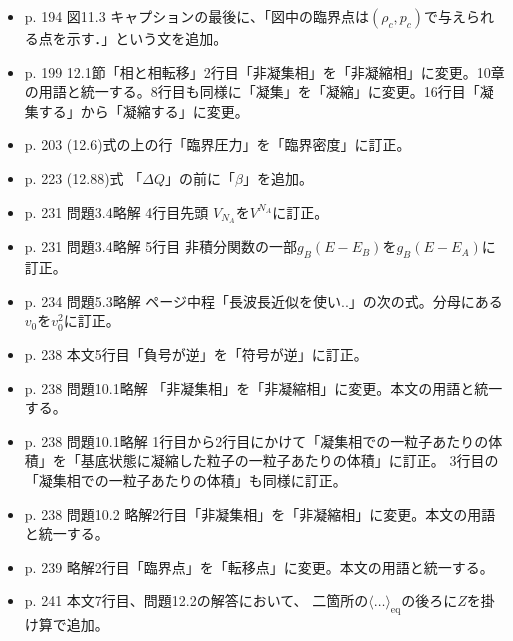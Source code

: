 \documentclass{ltjsarticle}
\begin{document}
\begin{itemize}
キャプションの最後に「図中の臨界点は$(\rho_{c}, T_{c})$で与えられる点を示す．」という文を追加。
\item
p. 194 図11.3 キャプションの最後に、「図中の臨界点は$(\rho_{c}, p_{c})$で与えられる点を示す．」という文を追加。
\item
p. 199 12.1節「相と相転移」2行目「非凝集相」を「非凝縮相」に変更。10章の用語と統一する。8行目も同様に「凝集」を「凝縮」に変更。16行目「凝集する」から「凝縮する」に変更。
\item
p. 203 (12.6)式の上の行「臨界圧力」を「臨界密度」に訂正。
\item
p. 223 (12.88)式 「$\Delta Q$」の前に「$\beta$」を追加。
\item
p. 231 問題3.4略解 4行目先頭 $V_{N_A}$を$V^{N_A}$に訂正。
\item
p. 231 問題3.4略解 5行目 非積分関数の一部$g_B(E-E_B)$を$g_B(E-E_A)$に訂正。
\item
p. 234 問題5.3略解 ページ中程「長波長近似を使い..」の次の式。分母にある$v_0$を$v_0^2$に訂正。
\item
p. 238 本文5行目「負号が逆」を「符号が逆」に訂正。
\item
p. 238 問題10.1略解 「非凝集相」を「非凝縮相」に変更。本文の用語と統一する。
\item
p. 238 問題10.1略解 1行目から2行目にかけて「凝集相での一粒子あたりの体積」を「基底状態に凝縮した粒子の一粒子あたりの体積」に訂正。
3行目の「凝集相での一粒子あたりの体積」も同様に訂正。
\item
p. 238 問題10.2 略解2行目「非凝集相」を「非凝縮相」に変更。本文の用語と統一する。
\item
p. 239 略解2行目「臨界点」を「転移点」に変更。本文の用語と統一する。
\item
p. 241 本文7行目、問題12.2の解答において、 二箇所の$\langle \dots \rangle_{\mathrm{eq}}$の後ろに$Z$を掛け算で追加。
\end{itemize}
\end{document}
